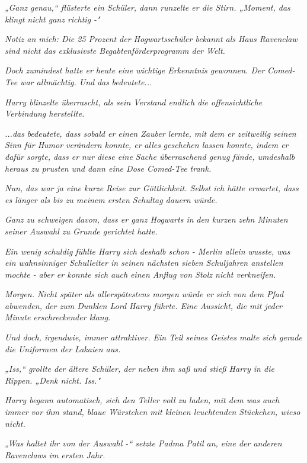 {\emph{„Ganz genau,“ flüsterte ein Schüler, dann runzelte er die Stirn. „Moment, das klingt nicht ganz richtig -"}

\emph{\emph{Notiz an mich: Die 25 Prozent der Hogwartsschüler bekannt als Haus Ravenclaw sind nicht das exklusivste Begabtenförderprogramm der Welt.}}

\emph{Doch zumindest hatte er heute eine wichtige Erkenntnis gewonnen. Der} \emph{Comed-Tee war allmächtig. Und} \emph{\emph{das}} \emph{bedeutete...}

\emph{Harry blinzelte überrascht, als sein Verstand endlich die offensichtliche Verbindung herstellte.}

\emph{...\emph{das}} \emph{bedeutete, dass sobald er einen Zauber lernte, mit dem er zeitweilig seinen Sinn für Humor verändern konnte, er} \emph{\emph{alles}} \emph{geschehen lassen konnte, indem er dafür sorgte, dass er} \emph{\emph{nur}} \emph{diese eine Sache überraschend genug fände, umdeshalb} \emph{heraus zu prusten} \emph{und dann eine Dose Comed-Tee trank.}

\emph{\emph{Nun, das war ja eine kurze Reise zur Göttlichkeit. Selbst ich hätte erwartet, dass es länger als bis zu meinem ersten Schultag dauern würde.}}

\emph{Ganz zu schweigen davon, dass er ganz Hogwarts in} \emph{den kurzen} \emph{zehn Minuten seiner Auswahl zu Grunde gerichtet hatte.}

\emph{Ein wenig schuldig fühlte Harry sich deshalb schon - Merlin allein wusste, was ein wahnsinniger Schulleiter in seinen nächsten sieben Schuljahren anstellen mochte - aber er konnte sich} \emph{\emph{auch}} \emph{einen Anflug von Stolz nicht verkneifen.}

\emph{Morgen. Nicht später als allerspätestens morgen würde er sich von dem Pfad abwenden, der zum Dunklen Lord Harry führte. Eine Aussicht, die mit jeder Minute erschreckender klang.}

\emph{Und doch, irgendwie, immer attraktiver. Ein Teil seines Geistes malte sich gerade die Uniformen der Lakaien aus.}

\emph{„Iss,“ grollte der ältere Schüler, der neben ihm saß und stieß Harry in die Rippen. „Denk nicht. Iss."}

\emph{Harry begann automatisch, sich den Teller voll zu laden, mit dem was auch immer vor ihm stand, blaue Würstchen mit kleinen leuchtenden Stückchen, wieso nicht.}

\emph{„Was haltet ihr von der Auswahl -“ setzte Padma Patil an, eine der anderen Ravenclaws im ersten Jahr.}

}
